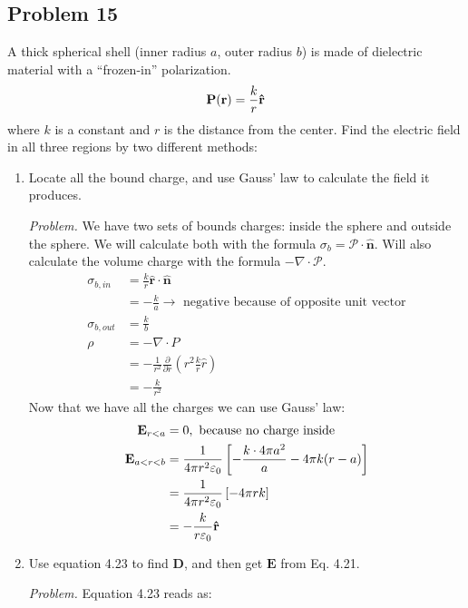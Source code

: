 \documentclass[10pt,oneside]{book}
\newcommand{\gspc}{\vspace{0.13cm}} %
\newcommand{\prt}[2]{\frac{\partial#1}{\partial#2}}
\newenvironment{problem}[1]
  {\vspace{-0.1cm}\begin{tcolorbox}[problembox]
   \textit{Problem. }#1}
  {\end{tcolorbox}\gspc}
\newcommand{\cpr}[1]{\left(#1\right)}
\newcommand{\unit}[1]{\mathbf{\hat{#1}}}
\begin{document}
\subsection*{Problem 15}
A thick spherical shell (inner radius $a$, outer radius $b$) is made of dielectric material with a ``frozen-in'' polarization.
\begin{align*}
  \mathbf P(\vr) = \frac{k}r\unit{r}
\end{align*}
where $k$ is a constant and $r$ is the distance from the center. Find the electric field in all three regions by two different methods:
\begin{enumerate}
  \item[(a)] Locate all the bound charge, and use Gauss' law to calculate the field it produces. 
  \begin{problem}
    We have two sets of bounds charges: inside the sphere and outside the sphere. We will calculate both with the formula $\sigma_b = \mathcal P \cdot \unit{n}$. Will also calculate the volume charge with the formula $-\nabla \cdot \mathcal P$. 
    \begin{align*}
      \sigma_{b, in}&=\frac{k}r\unit r \cdot \unit n \\
      &= -\frac{k}a \rightarrow\text{ negative because of opposite unit vector}\\
      \sigma_{b, out} &= \frac{k}b\\
      \rho &= -\nabla\cdot P \\
      &= -\frac{1}{r^2}\prt{}{r}\cpr{r^2\frac{k}r \hat r}\\
      &= -\frac{k}{r^2}
    \end{align*}
    Now that we have all the charges we can use Gauss' law:
    \begin{align*}
      \vE_{r<a} &= 0, \text{ because no charge inside}\\
      \vE_{a<r<b} &= \frac{1}{4\pi r^2\varepsilon_0}\left[-\frac{k\cdot 4\pi a^2}{a} - 4\pi k(r- a)\right]\\
      &= \frac{1}{4\pi r^2\varepsilon_0}\left[-4\pi rk\right]\\
      &= -\frac{k}{r\varepsilon_0}\unit{r}
    \end{align*}
  \end{problem}
  \item[(b)] Use equation 4.23 to find $\mathbf D$, and then get $\mathbf E$ from Eq. 4.21. 
  \begin{problem}
    Equation 4.23 reads as:
    \begin{align*}

\end{align*}
\end{problem}
\end{enumerate}
\end{document}
